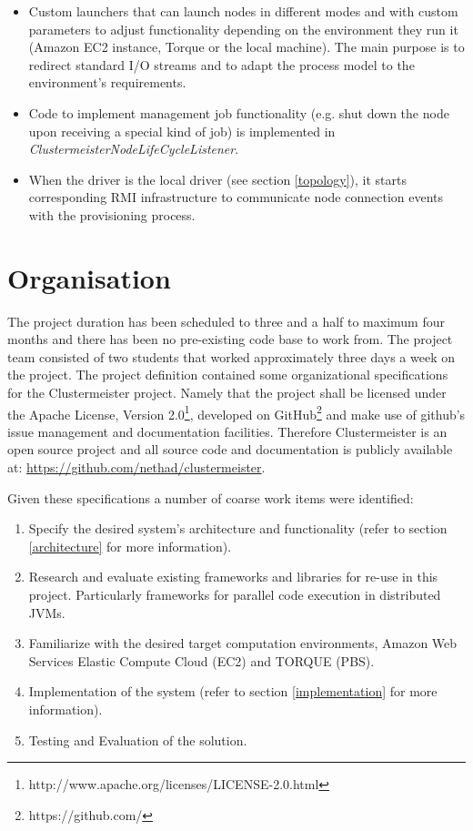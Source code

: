 \documentclass[12pt]{article}
\begin{document}
\begin{itemize}
\item Custom launchers that can launch nodes in different modes and with custom parameters to adjust functionality depending on the environment they run it (Amazon EC2 instance, Torque or the local machine). The main purpose is to redirect standard I/O streams and to adapt the process model to the environment's requirements.
\item Code to implement management job functionality (e.g. shut down the node upon receiving a special kind of job) is implemented in \textit{ClustermeisterNodeLifeCycleListener}.
\item When the driver is the local driver (see section \ref{topology}), it starts corresponding RMI infrastructure to communicate node connection events with the provisioning process.
\end{itemize}

\section{Organisation}

The project duration has been scheduled to three and a half to maximum four months and there has been no pre-existing code base to work from. The project team consisted of two students that worked approximately three days a week on the project. The project definition contained some organizational specifications for the Clustermeister project. Namely that the project shall be licensed under the Apache License, Version 2.0\footnote{http://www.apache.org/licenses/LICENSE-2.0.html}, developed on GitHub\footnote{https://github.com/} and make use of github's issue management and documentation facilities. Therefore Clustermeister is an open source project and all source code and documentation is publicly available at: \url{https://github.com/nethad/clustermeister}.

Given these specifications a number of coarse work items were identified:
\begin{enumerate}
\item \label{wi:spec}Specify the desired system's architecture and functionality (refer to section \ref{architecture} for more information).
\item \label{wi:res}Research and evaluate existing frameworks and libraries for re-use in this project. Particularly frameworks for parallel code execution in distributed JVMs.
\item \label{wi:fam}Familiarize with the desired target computation environments, Amazon Web Services Elastic Compute Cloud (EC2) and TORQUE (PBS).
\item \label{wi:impl}Implementation of the system (refer to section \ref{implementation} for more information).
\item \label{wi:eval}Testing and Evaluation of the solution.
\end{enumerate}
\end{document}
